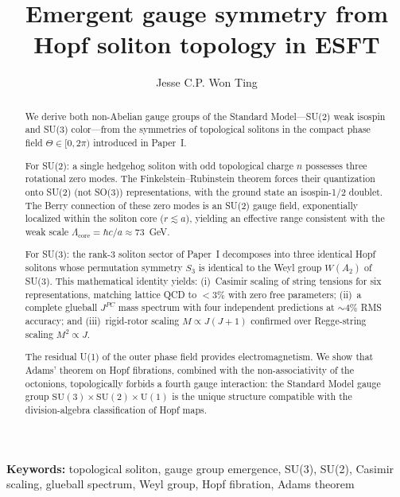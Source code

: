 \documentclass[a4paper,12pt]{article}
\begin{document}
\title{Emergent gauge symmetry from Hopf soliton topology in ESFT}

\author{Jesse C.P. Won Ting}

\begin{abstract}We derive both non-Abelian gauge groups of the Standard Model---SU(2)
weak isospin and SU(3) color---from the symmetries of topological
solitons in the compact phase field $\Theta \in [0,2\pi)$ introduced
in Paper~I.

For SU(2): a single hedgehog soliton with odd topological charge $n$
possesses three rotational zero modes. The Finkelstein--Rubinstein
theorem forces their quantization onto SU(2) (not SO(3))
representations, with the ground state an isospin-1/2 doublet.
The Berry connection of these zero modes is an SU(2) gauge field,
exponentially localized within the soliton core ($r \lesssim a$),
yielding an effective range consistent with the weak scale
$\Lambda_{\mathrm{core}} = \hbar c/a \approx 73$~GeV.

For SU(3): the rank-3 soliton sector of Paper~I decomposes into
three identical Hopf solitons whose permutation symmetry $S_3$ is
identical to the Weyl group $W(A_2)$ of SU(3). This mathematical
identity yields: (i)~Casimir scaling of string tensions for six
representations, matching lattice QCD to $<\!3\%$ with zero free
parameters; (ii)~a complete glueball $J^{PC}$ mass spectrum with
four independent predictions at $\sim\!4\%$ RMS accuracy; and
(iii)~rigid-rotor scaling $M \propto J(J+1)$ confirmed over
Regge-string scaling $M^2 \propto J$.

The residual U(1) of the outer phase field provides electromagnetism.
We show that Adams' theorem on Hopf fibrations, combined with the
non-associativity of the octonions, topologically forbids a fourth
gauge interaction: the Standard Model gauge group
$\mathrm{SU}(3) \times \mathrm{SU}(2) \times \mathrm{U}(1)$ is
the unique structure compatible with the division-algebra
classification of Hopf maps.
\end{abstract}

\maketitle

\noindent\textbf{Keywords:} topological soliton, gauge group emergence, SU(3), SU(2), Casimir scaling, glueball spectrum, Weyl group, Hopf fibration, Adams theorem


\end{document}
